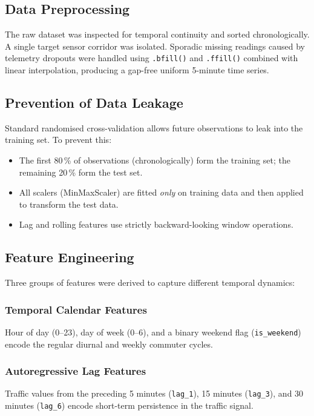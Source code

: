 \documentclass[12pt,a4paper]{article}
\begin{document}
\subsection{Data Preprocessing}

The raw dataset was inspected for temporal continuity and sorted chronologically.
A single target sensor corridor was isolated.  Sporadic missing readings caused by
telemetry dropouts were handled using \texttt{.bfill()} and \texttt{.ffill()} combined
with linear interpolation, producing a gap-free uniform 5-minute time series.

\subsection{Prevention of Data Leakage}

Standard randomised cross-validation allows future observations to leak into the
training set.  To prevent this:
\begin{itemize}
  \item The first 80\,\% of observations (chronologically) form the training set; the
        remaining 20\,\% form the test set.
  \item All scalers (MinMaxScaler) are fitted \emph{only} on training data and then
        applied to transform the test data.
  \item Lag and rolling features use strictly backward-looking window operations.
\end{itemize}

\subsection{Feature Engineering}

Three groups of features were derived to capture different temporal dynamics:

\subsubsection{Temporal Calendar Features}
Hour of day (0--23), day of week (0--6), and a binary weekend flag (\texttt{is\_weekend})
encode the regular diurnal and weekly commuter cycles.

\subsubsection{Autoregressive Lag Features}
Traffic values from the preceding 5 minutes (\texttt{lag\_1}), 15 minutes
(\texttt{lag\_3}), and 30 minutes (\texttt{lag\_6}) encode short-term persistence
in the traffic signal.
\end{document}
